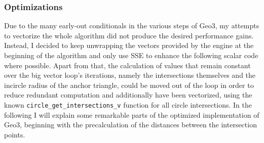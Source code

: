 \subsubsection{Optimizations}
Due to the many early-out conditionals in the various steps of Geo3, my attempts to vectorize the whole algorithm did not produce the desired performance gains. Instead, I decided to keep unwrapping the vectors provided by the engine at the beginning of the algorithm and only use SSE to enhance the following scalar code where possible. Apart from that, the calculation of values that remain constant over the big vector loop's iterations, namely the intersections themselves and the incircle radius of the anchor triangle, could be moved out of the loop in order to reduce redundant computation and additionally have been vectorized, using the known \texttt{circle\_get\_intersections\_v} function for all circle intersections. In the following I will explain some remarkable parts of the optimized implementation of Geo3, beginning with the precalculation of the distances between the intersection points.

